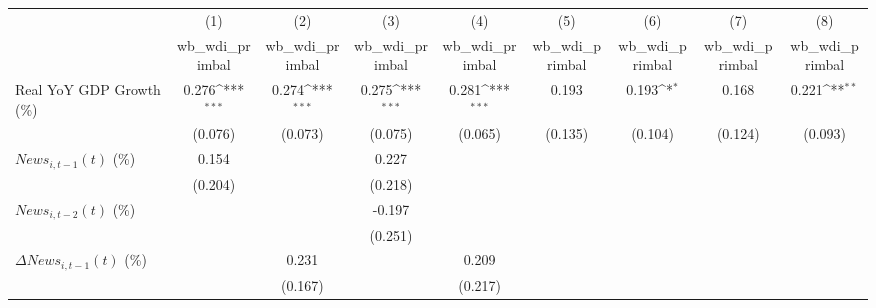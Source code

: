 {
\def\sym#1{\ifmmode^{#1}\else\(^{#1}\)\fi}
\begin{tabular}{l*{8}{c}}
\toprule
                    &\multicolumn{1}{c}{(1)}&\multicolumn{1}{c}{(2)}&\multicolumn{1}{c}{(3)}&\multicolumn{1}{c}{(4)}&\multicolumn{1}{c}{(5)}&\multicolumn{1}{c}{(6)}&\multicolumn{1}{c}{(7)}&\multicolumn{1}{c}{(8)}\\
                    &\multicolumn{1}{c}{wb_wdi_primbal}&\multicolumn{1}{c}{wb_wdi_primbal}&\multicolumn{1}{c}{wb_wdi_primbal}&\multicolumn{1}{c}{wb_wdi_primbal}&\multicolumn{1}{c}{wb_wdi_primbal}&\multicolumn{1}{c}{wb_wdi_primbal}&\multicolumn{1}{c}{wb_wdi_primbal}&\multicolumn{1}{c}{wb_wdi_primbal}\\
\midrule
Real YoY GDP Growth (\%)&       0.276\sym{***}&       0.274\sym{***}&       0.275\sym{***}&       0.281\sym{***}&       0.193         &       0.193\sym{*}  &       0.168         &       0.221\sym{**} \\
                    &     (0.076)         &     (0.073)         &     (0.075)         &     (0.065)         &     (0.135)         &     (0.104)         &     (0.124)         &     (0.093)         \\
\addlinespace
$ News_{i,t-1}(t)$ (\%)&       0.154         &                     &       0.227         &                     &                     &                     &                     &                     \\
                    &     (0.204)         &                     &     (0.218)         &                     &                     &                     &                     &                     \\
\addlinespace
$ News_{i,t-2}(t)$ (\%)&                     &                     &      -0.197         &                     &                     &                     &                     &                     \\
                    &                     &                     &     (0.251)         &                     &                     &                     &                     &                     \\
\addlinespace
$ \Delta News_{i,t-1}(t)$ (\%)&                     &       0.231         &                     &       0.209         &                     &                     &                     &                     \\
                    &                     &     (0.167)         &                     &     (0.217)         &                     &                     &                     &                     \\

\end{tabular}}
